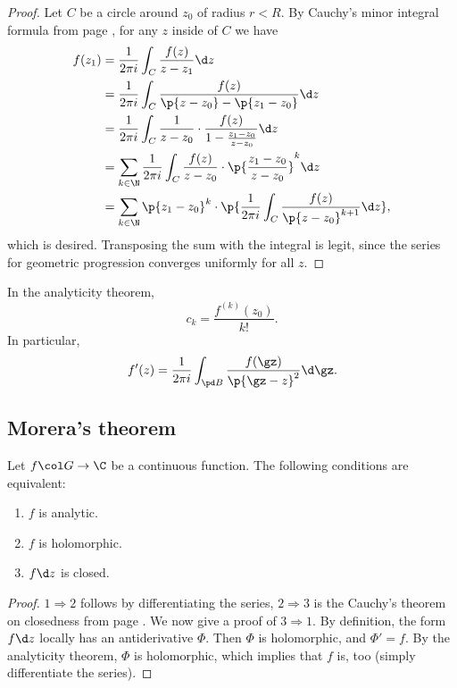 \begin{proof}
  Let $C$ be a circle around $z_0$ of radius $r < R$.
  By Cauchy's minor integral formula from page \pageref{Cauchy, minor integral formula}, for any $z$ inside of $C$ we have
  \begin{align*}
    f(z_1)
    &= \frac{1}{2\pi i} \int_C \frac{f(z)}{z-z_1} \d z \\
    &= \frac{1}{2\pi i} \int_C \frac{f(z)}{\p{z-z_0}-\p{z_1-z_0}} \d z \\
    &= \frac{1}{2\pi i} \int_C \frac{1}{z-z_0} \cdot \frac{f(z)}{1-\frac{z_1-z_0}{z-z_0}} \d z \\
    &= \sum_{k\in \N} \frac{1}{2\pi i} \int_C \frac{f(z)}{z-z_0} \cdot \p{\frac{z_1-z_0}{z-z_0}}^k \d z \\
    &= \sum_{k\in \N} \p{z_1-z_0}^k \cdot \p{ \frac{1}{2\pi i} \int_C \frac{f(z)}{\p{z-z_0}^{k+1}} \d z },
  \end{align*}
  which is desired.
  Transposing the sum with the integral is legit, since the series for geometric progression converges uniformly for all $z$.
\end{proof}

\begin{remark}
  In the analyticity theorem,
  $$ c_k = \frac{f^{(k)}(z_0)}{k!}. $$
  In particular,
  $$ f'(z) = \frac{1}{2\pi i} \int_{\pd B} \frac{f(\gz)}{\p{\gz-z}^2} \d \gz. $$
\end{remark}

\subsection{Morera's theorem}

\begin{corollary}
  Let $f \col G \to \C$ be a continuous function.
  The following conditions are equivalent:
  \begin{enumerate}
    \item $f$ is analytic.
    \item $f$ is holomorphic.
    \item $f \d z$ is closed. 
  \end{enumerate}
\end{corollary}


\begin{proof}
  $1 \Rightarrow 2$ follows by differentiating the series, $2 \Rightarrow 3$ is the Cauchy's theorem on closedness from page \pageref{Cauchy, on closedness}. We now give a proof of $3 \Rightarrow 1$. By definition, the form $f \d z$ locally has an antiderivative $\Phi$. Then $\Phi$ is holomorphic, and $\Phi' = f$. By the analyticity theorem, $\Phi$ is holomorphic, which implies that $f$ is, too (simply differentiate the series). 
\end{proof}

